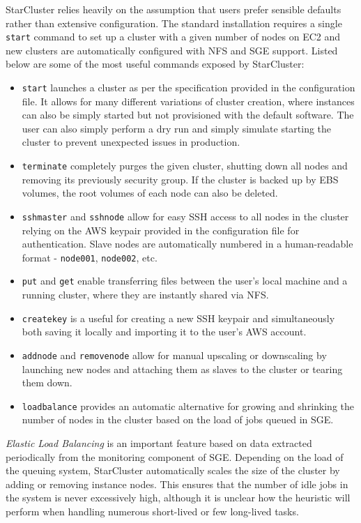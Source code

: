 StarCluster relies heavily on the assumption that users prefer sensible defaults rather than extensive configuration. The standard installation requires a single \verb|start| command to set up a cluster with a given number of nodes on EC2 and new clusters are automatically configured with NFS and SGE support. Listed below are some of the most useful commands exposed by StarCluster:
\begin{itemize}
	\item \verb|start| launches a cluster as per the specification provided in the configuration file. It allows for many different variations of cluster creation, where instances can also be simply started but not provisioned with the default software. The user can also simply perform a dry run and simply simulate starting the cluster to prevent unexpected issues in production.
	\item \verb|terminate| completely purges the given cluster, shutting down all nodes and removing its previously security group. If the cluster is backed up by EBS volumes, the root volumes of each node can also be deleted.
	\item \verb|sshmaster| and \verb|sshnode| allow for easy SSH access to all nodes in the cluster relying on the AWS keypair provided in the configuration file for authentication. Slave nodes are automatically numbered in a human-readable format - \verb|node001|, \verb|node002|, etc.
	\item \verb|put| and \verb|get| enable transferring files between the user's local machine and a running cluster, where they are instantly shared via NFS.
	\item \verb|createkey| is a useful for creating a new SSH keypair and simultaneously both saving it locally and importing it to the user's AWS account.
	\item \verb|addnode| and \verb|removenode| allow for manual upscaling or downscaling by launching new nodes and attaching them as slaves to the cluster or tearing them down.
	\item \verb|loadbalance| provides an automatic alternative for growing and shrinking the number of nodes in the cluster based on the load of jobs queued in SGE.
\end{itemize}

\textit{Elastic Load Balancing} is an important feature based on data extracted periodically from the monitoring component of SGE. Depending on the load of the queuing system, StarCluster automatically scales the size of the cluster by adding or removing instance nodes. This ensures that the number of idle jobs in the system is never excessively high, although it is unclear how the heuristic will perform when handling numerous short-lived or few long-lived tasks. 


